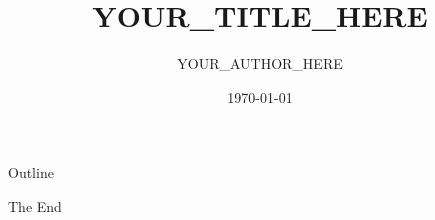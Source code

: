 \documentclass[aspectratio=169]{beamer}
\title{YOUR_TITLE_HERE}
\author{YOUR_AUTHOR_HERE}
\institute{YOUR_INSTITUTE_HERE}
\date{\today}
\begin{document}
\begin{frame}
    \titlepage
\end{frame}

\begin{frame}{Outline}
    \tableofcontents
\end{frame}



\begin{frame}[plain,c]
    \begin{center}
        \Huge The End
    \end{center}
\end{frame}
\end{document}
